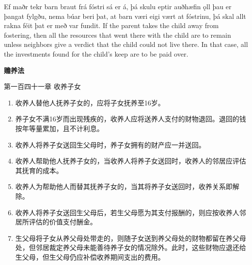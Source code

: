 \begin{paracol}{2}
    Ef maðr tekr barn braut frá fóstri sá er á, þá skulu eptir auðhæfin ǫll þau er þangat fylgðu, nema búar beri þat, at barn væri eigi vært at fóstrinu, þá skal allt rakna féit þat er með var fundit.
    \switchcolumn
    If the parent takes the child away from fostering, then all the resources that went there with the child are to remain unless neighbors give a verdict that the child could not live there. In that case, all the investments found for the child's keep are to be paid over.
\end{paracol}
\begin{translation*}{}
    \begin{center}
        \textbf{赡养法}

        第一百四十一章 \quad 收养子女
    \end{center}
    \AddEnumerateCounter{\chinese}{\chinese}{}
    \begin{enumerate}[label={\chinese*}、]
        \item 收养人替他人抚养子女的，应将子女抚养至16岁。

        \item 养子女不满16岁而出现残疾的，收养人应将送养人支付的财物退回。退回的钱按年等量累加，且不计利息。

        \item 收养人将养子女送回生父母时，养子女拥有的财产应一并送回。

        \item 收养人帮助他人抚养子女的，当收养人将养子女送回时，收养人的邻居应评估其抚育的成本。

        \item 收养人为帮助他人而替其抚养子女的，当其将养子女送回时，收养关系即解除。

        \item 收养人将养子女送回生父母后，若生父母愿为其支付报酬的，则应按收养人邻居所评估的价值支付酬金。

        \item 生父母将子女从养父母处带走的，则随子女送到养父母处的财物都留在养父母处，但邻居裁定养父母未能善待养子女的情况除外。此时，这些财物应退还给生父母，但生父母仍应补偿收养期间支出的费用。
    \end{enumerate}
\end{translation*}

